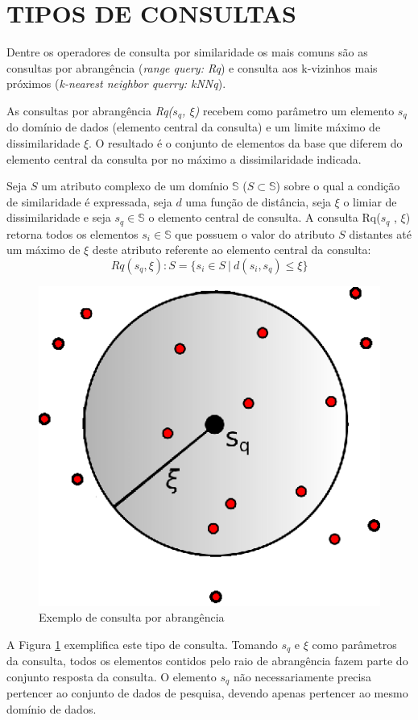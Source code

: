 \section{TIPOS DE CONSULTAS}
\label{sec:tiposconsultas}

Dentre os operadores de consulta por similaridade os mais comuns são as consultas por abrangência (\textit{range query: Rq}) e consulta aos k-vizinhos mais próximos (\textit{k-nearest neighbor querry: kNNq}).\par 

As consultas por abrangência \textit{Rq($s_q$, $\xi$)} recebem como parâmetro um elemento $s_q$ do domínio de dados (elemento central da consulta) e um limite máximo de dissimilaridade $\xi$. O resultado é o conjunto de 
elementos da base que diferem do elemento central da consulta por no máximo a dissimilaridade indicada.\par
\begin{mydef}
 \label{def:def_rq}
  Seja $S$ um atributo complexo de um domínio $\mathbb{S}$ ($S \subset \mathbb{S}$) sobre o qual a condição de similaridade é expressada, seja $d$ uma
  função de distância, seja $\xi$ o limiar de dissimilaridade e seja $s_q \in \mathbb{S}$ o elemento central de consulta. 
  A consulta Rq($s_q$ , $\xi$) retorna todos os elementos $s_i \in \mathbb{S}$ que possuem o valor do atributo $S$ distantes
  até um máximo de $\xi$ deste atributo referente ao elemento central da consulta: 
  \begin{equation} \label{eq:knnq}   
    Rq(s_q, \xi): S = \{s_i \in S \ |\ d(s_i, s_q) \leq \xi\}
  \end{equation}
\end{mydef}

\begin{figure}[H]
\centering
\includegraphics[width=.4\textwidth]{dados/figuras/rqu.eps}
\caption{Exemplo de consulta por abrangência}
\label{fig:exemplorq}
\end{figure}

A Figura \ref{fig:exemplorq} exemplifica este tipo de consulta. Tomando $s_q$ e $\xi$ como parâmetros da consulta, todos os
elementos contidos pelo raio de abrangência fazem parte do conjunto resposta da consulta. O elemento $s_q$ não necessariamente precisa
pertencer ao conjunto de dados de pesquisa, devendo apenas pertencer ao mesmo domínio de dados.


